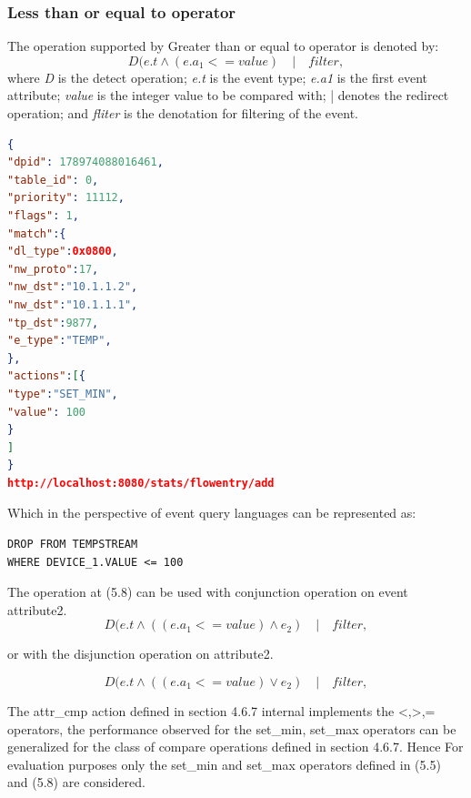 \subsubsection{Less than or equal to operator}
The operation supported by Greater than or equal to operator is denoted by:
\begin{equation}D(e.t  \wedge (e.a_1 <= value) \quad | \quad filter, \end{equation}
where \textit{D} is the detect operation; \newline
\textit{e.t} is the event type; \newline
\textit{e.a1} is the first event attribute; \newline
\textit{value} is the integer value to be compared with; \newline
| denotes the redirect operation; \newline
and \textit{fliter} is the denotation for filtering of the event. \newline \newline
\begin{lstlisting}[language=json,firstnumber=1]
{
"dpid": 178974088016461,
"table_id": 0,
"priority": 11112,
"flags": 1,
"match":{
"dl_type":0x0800,
"nw_proto":17,
"nw_dst":"10.1.1.2",
"nw_dst":"10.1.1.1",
"tp_dst":9877,
"e_type":"TEMP",
},
"actions":[{
"type":"SET_MIN",
"value": 100
}
]
}
http://localhost:8080/stats/flowentry/add \end{lstlisting}

Which in the perspective of event query languages can be represented as:

\begin{verbatim}
DROP FROM TEMPSTREAM
WHERE DEVICE_1.VALUE <= 100
\end{verbatim}

The operation at (5.8) can be used with conjunction operation on event attribute2.
\begin{equation}D(e.t  \wedge ((e.a_1 <= value) \wedge e_2 )\quad | \quad filter, \end{equation}

or with the disjunction operation on attribute2.

\begin{equation}D(e.t  \wedge ((e.a_1 <= value) \vee e_2 )\quad | \quad filter, \end{equation}

The attr_cmp action defined in section 4.6.7 internal implements the {<,>,=} operators, the performance observed for the set_min, set_max operators can be generalized for the class of compare operations defined in section 4.6.7. Hence For evaluation purposes only the set_min and set_max operators defined in (5.5) and (5.8) are considered. 


